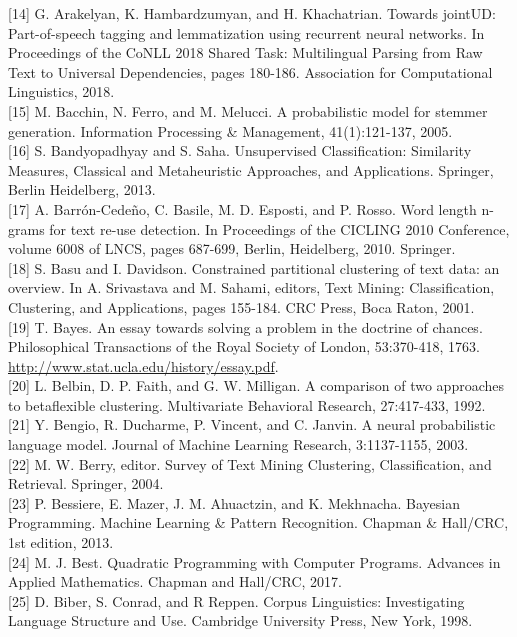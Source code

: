 \documentclass[10pt]{book}
\begin{document}
[14] G. Arakelyan, K. Hambardzumyan, and H. Khachatrian. Towards jointUD: Part-of-speech tagging and lemmatization using recurrent neural networks. In Proceedings of the CoNLL 2018 Shared Task: Multilingual Parsing from Raw Text to Universal Dependencies, pages 180-186. Association for Computational Linguistics, 2018.\\[0pt]
[15] M. Bacchin, N. Ferro, and M. Melucci. A probabilistic model for stemmer generation. Information Processing \& Management, 41(1):121-137, 2005.\\[0pt]
[16] S. Bandyopadhyay and S. Saha. Unsupervised Classification: Similarity Measures, Classical and Metaheuristic Approaches, and Applications. Springer, Berlin Heidelberg, 2013.\\[0pt]
[17] A. Barrón-Cedeño, C. Basile, M. D. Esposti, and P. Rosso. Word length n-grams for text re-use detection. In Proceedings of the CICLING 2010 Conference, volume 6008 of LNCS, pages 687-699, Berlin, Heidelberg, 2010. Springer.\\[0pt]
[18] S. Basu and I. Davidson. Constrained partitional clustering of text data: an overview. In A. Srivastava and M. Sahami, editors, Text Mining: Classification, Clustering, and Applications, pages 155-184. CRC Press, Boca Raton, 2001.\\[0pt]
[19] T. Bayes. An essay towards solving a problem in the doctrine of chances. Philosophical Transactions of the Royal Society of London, 53:370-418, 1763. \href{http://www.stat.ucla.edu/history/essay.pdf}{http://www.stat.ucla.edu/history/essay.pdf}.\\[0pt]
[20] L. Belbin, D. P. Faith, and G. W. Milligan. A comparison of two approaches to betaflexible clustering. Multivariate Behavioral Research, 27:417-433, 1992.\\[0pt]
[21] Y. Bengio, R. Ducharme, P. Vincent, and C. Janvin. A neural probabilistic language model. Journal of Machine Learning Research, 3:1137-1155, 2003.\\[0pt]
[22] M. W. Berry, editor. Survey of Text Mining Clustering, Classification, and Retrieval. Springer, 2004.\\[0pt]
[23] P. Bessiere, E. Mazer, J. M. Ahuactzin, and K. Mekhnacha. Bayesian Programming. Machine Learning \& Pattern Recognition. Chapman \& Hall/CRC, 1st edition, 2013.\\[0pt]
[24] M. J. Best. Quadratic Programming with Computer Programs. Advances in Applied Mathematics. Chapman and Hall/CRC, 2017.\\[0pt]
[25] D. Biber, S. Conrad, and R Reppen. Corpus Linguistics: Investigating Language Structure and Use. Cambridge University Press, New York, 1998.\\[0pt]
\end{document}
